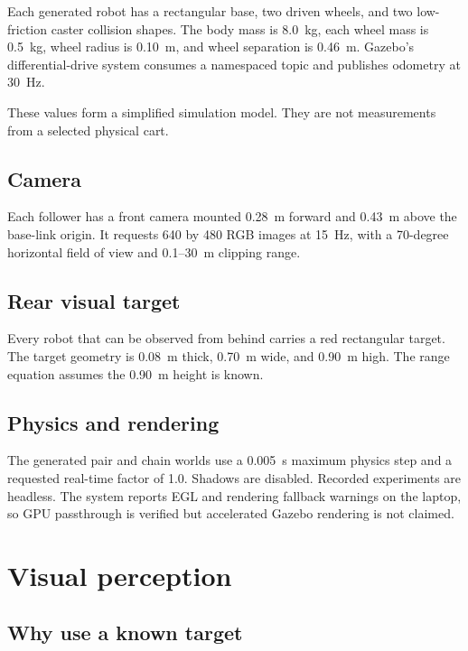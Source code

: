 \documentclass[11pt,oneside,openany]{book}
\newcommand{\file}[1]{\path{#1}}
\begin{document}
Each generated robot has a rectangular base, two driven wheels, and two low-friction caster collision shapes. The body mass is 8.0~kg, each wheel mass is 0.5~kg, wheel radius is 0.10~m, and wheel separation is 0.46~m. Gazebo's differential-drive system consumes a namespaced \file{cmd_vel} topic and publishes odometry at 30~Hz.

These values form a simplified simulation model. They are not measurements from a selected physical cart.

\section{Camera}

Each follower has a front camera mounted 0.28~m forward and 0.43~m above the base-link origin. It requests 640 by 480 RGB images at 15~Hz, with a 70-degree horizontal field of view and 0.1--30~m clipping range.

\section{Rear visual target}

Every robot that can be observed from behind carries a red rectangular target. The target geometry is 0.08~m thick, 0.70~m wide, and 0.90~m high. The range equation assumes the 0.90~m height is known.

\section{Physics and rendering}

The generated pair and chain worlds use a 0.005~s maximum physics step and a requested real-time factor of 1.0. Shadows are disabled. Recorded experiments are headless. The system reports EGL and rendering fallback warnings on the laptop, so GPU passthrough is verified but accelerated Gazebo rendering is not claimed.

\chapter{Visual perception}

\section{Why use a known target}
\end{document}
